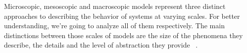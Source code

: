 \documentclass[class={myRUCProject}, crop=false]{standalone}
\begin{document}


Microscopic, mesoscopic and macroscopic models represent three distinct approaches to describing the behavior of systems at varying scales. For better understanding, we're going to analyze all of them respectively. The main distinctions between those scales of models are the size of the phenomena they describe, the details and the level of abstraction they provide ~\cite{Lachowicz2011}. 
\end{document}
